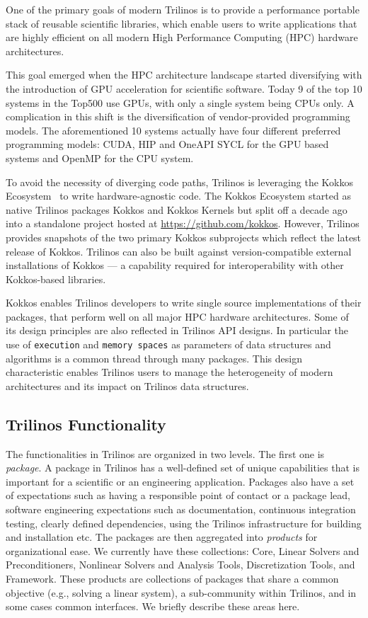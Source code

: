 One of the primary goals of modern Trilinos is to provide a performance portable stack of
reusable scientific libraries, which enable users to write applications that are highly
efficient on all modern High Performance Computing (HPC) hardware architectures.

This goal emerged when the HPC architecture landscape started diversifying with the
introduction of GPU acceleration for scientific software. Today 9 of the top 10 systems
in the Top500 use GPUs, with only a single system being CPUs only.
A complication in this shift is the diversification of vendor-provided programming models.
The aforementioned 10 systems actually have four different preferred programming models:
CUDA, HIP and OneAPI SYCL for the GPU based systems and OpenMP for the CPU system.

To avoid the necessity of diverging code paths, Trilinos is leveraging the Kokkos Ecosystem~\cite{trott2021kokkos}
to write hardware-agnostic code. The Kokkos Ecosystem started as native Trilinos packages
Kokkos and Kokkos Kernels but split off a decade ago into a standalone project hosted at \url{https://github.com/kokkos}.
However, Trilinos provides snapshots of the two primary Kokkos subprojects which reflect
the latest release of Kokkos. Trilinos can also be built against version-compatible
external installations of Kokkos --- a capability required for interoperability with other
Kokkos-based libraries.

Kokkos enables Trilinos developers to write single source implementations of their packages,
that perform well on all major HPC hardware architectures.
Some of its design principles are also reflected in Trilinos API designs. In particular the
use of \texttt{execution} and \texttt{memory spaces} as parameters of data structures and
algorithms is a common thread through many packages.
This design characteristic enables Trilinos users to manage the heterogeneity of modern architectures
and its impact on Trilinos data structures.

\subsection{Trilinos Functionality}

The functionalities in Trilinos are organized in two levels. The first one is \textit{package}. A package in Trilinos has a well-defined set of unique capabilities that is important for a scientific or an engineering application. Packages also have a set of expectations such as having a responsible point of contact or a package lead, software engineering expectations such as documentation, continuous integration testing, clearly defined dependencies, using the Trilinos infrastructure for building and installation etc. The packages are then aggregated into \emph{products} for organizational ease. We currently have these collections: Core, Linear Solvers and Preconditioners, Nonlinear Solvers and Analysis Tools, Discretization Tools, and Framework. These products are collections of packages that share a common objective (e.g., solving a linear system), a sub-community within Trilinos, and in some cases common interfaces. We briefly describe these areas here.

